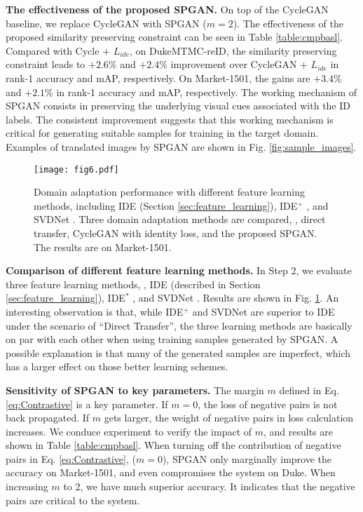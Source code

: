 \documentclass[10pt,twocolumn,letterpaper]{article}
\begin{document}
\textbf{The effectiveness of the proposed SPGAN.} On top of the CycleGAN baseline, we replace CycleGAN with SPGAN ($m=2$). The effectiveness of the proposed similarity preserving constraint can be seen in Table \ref{table:cmpbasl}. Compared with Cycle + $L_{ide}$, on DukeMTMC-reID, the similarity preserving constraint leads to $+2.6\%$ and $+2.4\%$ improvement over CycleGAN + $L_{ide}$ in rank-1 accuracy and  mAP, respectively. On Market-1501, the gains are $+3.4\%$ and $+2.1\%$ in rank-1 accuracy and mAP, respectively. The working mechanism of SPGAN consists in preserving the underlying visual cues associated with the ID labels. The consistent improvement suggests that this working mechanism is critical for generating suitable samples for training in the target domain. Examples of translated images by SPGAN are shown in Fig. \ref{fig:sample_images}.


\begin{figure}[t]
\setlength{\abovecaptionskip}{-0.2cm} 
\setlength{\belowcaptionskip}{-0.2cm}
\begin{center}
\texttt{[image: fig6.pdf]}
\end{center}
\caption{Domain adaptation performance with different feature learning methods, including IDE (Section \ref{sec:feature_learning}), IDE$^+$ \cite{zhong2017re}, and SVDNet \cite{SVD}. Three domain adaptation methods are compared, \ie, direct transfer, CycleGAN with identity loss, and the proposed SPGAN. The results are on Market-1501.}
\label{fig:fig6}
\end{figure}
 
\textbf{Comparison of different feature learning methods.} In Step 2, we evaluate three feature learning methods, \ie, IDE \cite{DBLP:journals/corr/ZhengYH16} (described in Section \ref{sec:feature_learning}), IDE$^*$ \cite{zhong2017re}, and SVDNet \cite{SVD}. Results are shown in Fig. \ref{fig:fig6}. 
An interesting observation is that, while IDE$^+$ and SVDNet are superior to IDE under the scenario of ``Direct Transfer'', the three learning methods are basically on par with each other when using training samples generated by SPGAN. A possible explanation is that many of the generated samples are imperfect, which has a larger effect on those better learning schemes. 
 
\textbf{Sensitivity of SPGAN to key parameters.}
The margin $m$ defined in Eq. \ref{eq:Contrastive} is a key parameter. If $m=0$, the loss of negative pairs is not back propagated. If $m$ gets larger, the weight of negative pairs in loss calculation increases.  We conduce experiment to verify the impact of $m$, and results are shown in Table \ref{table:cmpbasl}. When turning off the contribution of negative pairs in Eq. \ref{eq:Contrastive}, ($m=0$), SPGAN only marginally improve the accuracy on Market-1501, and even compromises the system on Duke. When increasing $m$ to 2, we have much superior accuracy. It indicates that the negative pairs are critical to the system. %
\end{document}
